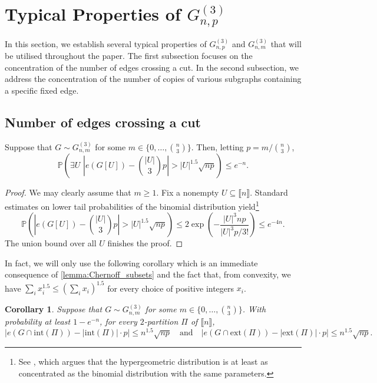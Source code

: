 \documentclass[11pt,a4paper,oneside,reqno]{amsart}
\newtheorem{cor}[thm]{Corollary}
\newcommand{\Gnp}{G_{n, p}^{(3)}}
\renewcommand{\Pr}{\mathbb{P}}
\newcommand{\1}{\mathbbm{1}} %
\newcommand{\br}[1]{\llbracket{#1}\rrbracket}
\renewcommand{\le}{\leqslant}
\renewcommand{\ge}{\geqslant}
\newcommand{\ext}{\mathrm{ext}}
\renewcommand{\int}{\mathrm{int}}
\begin{document}
\section{Typical Properties of $\Gnp$}\label{section:typical-props}
In this section, we establish several typical properties of $\Gnp$ and $G_{n, m}^{(3)}$ that will be utilised throughout the paper. The first subsection focuses on the concentration of the number of edges crossing a cut. In the second subsection, we address the concentration of the number of copies of various subgraphs containing a specific fixed edge.

\subsection{Number of edges crossing a cut}

\begin{lemma}\label{lemma:Chernoff_subsets}
  Suppose that $G \sim G_{n, m}^{(3)}$ for some $m \in \{0, \dotsc, \binom{n}{3}\}$. Then, letting $p = m/\binom{n}{3}$,
  \[
    \Pr\left(\exists U\,\,\left|e(G[U]) - \binom{|U|}{3}p \right| > |U|^{1.5}\sqrt{np}\right) \le e^{-n}.
  \]
\end{lemma}

\begin{proof}
  We may clearly assume that $m \ge 1$.
  Fix a nonempty $U\subseteq\br{n}$.  Standard estimates on lower tail probabilities of the binomial distribution yield\footnote{See \cite[Section~6]{Hoe63}, which argues that the hypergeometric distribution is at least as concentrated as the binomial distribution with the same parameters.}
  \[
    \Pr\left(\left|e(G[U]) - \binom{|U|}{3} p\right| > |U|^{1.5} \sqrt{np}\right)\leq 2\exp\left(-\frac{|U|^3np}{|U|^3 p/3! }\right)\le e^{-4n}.
  \]
  The union bound over all $U$ finishes the proof.
\end{proof}

In fact, we will only use the following corollary which is an immediate consequence of \ref{lemma:Chernoff_subsets} and the fact that, from convexity, we have $\sum_{i} x_i^{1.5} \le (\sum_i x_i)^{1.5}$ for every choice of positive integers $x_i$.

\begin{cor}\label{cor:equiv_classes_edges_count}
  Suppose that $G \sim G_{n, m}^{(3)}$ for some $m \in \{0, \dotsc, \binom{n}{3}\}$.
  With probability at least $1 - e^{-n}$, for every $2$-partition $\Pi$ of $\br{n}$,
  \[
    \left|e\left(G \cap \int(\Pi)\right) - |\int(\Pi)| \cdot p \right| \le n^{1.5}\sqrt{np} \quad \text{and} \quad \left|e\left(G \cap \ext(\Pi)\right) - |\ext(\Pi)| \cdot p \right| \le n^{1.5}\sqrt{np}.
  \]
\end{cor}
\end{document}
